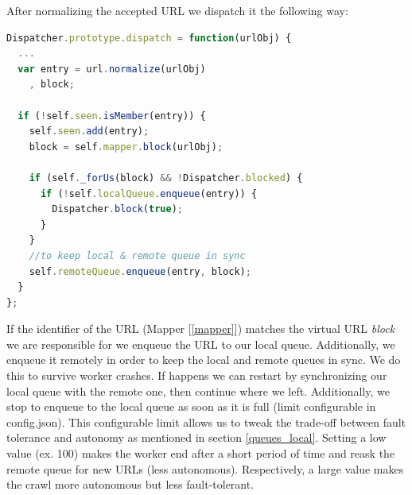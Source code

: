 After normalizing the accepted URL we dispatch it the following way:

\begin{lstlisting}[language=JavaScript]
Dispatcher.prototype.dispatch = function(urlObj) {
  ...
  var entry = url.normalize(urlObj)
    , block;
  
  if (!self.seen.isMember(entry)) {
    self.seen.add(entry);
    block = self.mapper.block(urlObj);
  
    if (self._forUs(block) && !Dispatcher.blocked) {
      if (!self.localQueue.enqueue(entry)) {
        Dispatcher.block(true);
      }                                                                                                                                
    }
    //to keep local & remote queue in sync
    self.remoteQueue.enqueue(entry, block);
  }
};
\end{lstlisting}

If the identifier of the URL (Mapper [\ref{mapper}]) matches the virtual URL \emph{block} we are responsible for we enqueue the URL to our local queue. Additionally, we enqueue it remotely in order to keep the local and remote queues in sync. We do this to survive worker crashes. If happens we can restart by synchronizing our local queue with the remote one, then continue where we left. Additionally, we stop to enqueue to the local queue as soon as it is full (limit configurable in config.json). This configurable limit allows us to tweak the trade-off between fault tolerance and autonomy as mentioned in section \ref{queues_local}. Setting a low value (ex. 100) makes the worker end after a short period of time and reask the remote queue for new URLs (less autonomous). Respectively, a large value makes the crawl more autonomous but less fault-tolerant.

